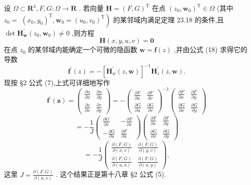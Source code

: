 \begin{example}

\end{example}
设 \(\Omega  \subset  {\mathbf{R}}^{4},F,G : \Omega  \rightarrow  \mathbf{R}\) . 若向量 \(\mathbf{H} = {\left( F,G\right) }^{\mathrm{T}}\) 在点 \({\left( {z}_{0},{\mathbf{w}}_{0}\right) }^{\mathrm{T}} \in  \Omega\) (其中 \({z}_{0} =\)  \(\left. {{\left( {x}_{0},{y}_{0}\right) }^{\mathrm{T}},{\mathbf{w}}_{0} = {\left( {u}_{0},{v}_{0}\right) }^{\mathrm{T}}}\right)\) 的某邻域内满足定理 23.18 的条件,且 \(\det {\mathbf{H}}_{\mathbf{w}}^{\prime }\left( {{z}_{0},{\mathbf{w}}_{0}}\right)  \neq  0\) ,则方程
\[
\mathbf{H}\left( {x,y,u,v}\right)  = \mathbf{0}
\]
在点 \({z}_{0}\) 的某邻域内能确定一个可微的隐函数 \(\mathbf{w} = \mathbf{f}\left( z\right)\) ,并由公式 (18) 求得它的导数
\[
{\mathbf{f}}^{\prime }\left( z\right)  =  - {\left\lbrack  {\mathbf{H}}_{w}^{\prime }\left( z,\mathbf{w}\right) \right\rbrack  }^{-1}{\mathbf{H}}_{z}^{\prime }\left( {z,\mathbf{w}}\right) .
\]
现按 §2 公式 (7),上式可详细地写作
\[
{\mathbf{f}}^{\prime }\left( \mathbf{z}\right)  = \left( \begin{array}{ll} \frac{\partial u}{\partial x} & \frac{\partial u}{\partial y} \\  \frac{\partial v}{\partial x} & \frac{\partial v}{\partial y} \end{array}\right)  =  - {\left( \begin{array}{ll} \frac{\partial F}{\partial u} & \frac{\partial F}{\partial v} \\  \frac{\partial G}{\partial u} & \frac{\partial G}{\partial v} \end{array}\right) }^{-1}\left( \begin{array}{ll} \frac{\partial F}{\partial x} & \frac{\partial F}{\partial y} \\  \frac{\partial G}{\partial x} & \frac{\partial G}{\partial y} \end{array}\right)
\]
\[
=  - \frac{1}{J}\left( \begin{array}{rr} \frac{\partial G}{\partial v} &  - \frac{\partial F}{\partial v} \\   - \frac{\partial G}{\partial u} & \frac{\partial F}{\partial u} \end{array}\right) \left( \begin{array}{ll} \frac{\partial F}{\partial x} & \frac{\partial F}{\partial y} \\  \frac{\partial G}{\partial x} & \frac{\partial G}{\partial y} \end{array}\right)
\]
\[
=  - \frac{1}{J}\left( \begin{array}{ll} \frac{\partial \left( {F,G}\right) }{\partial \left( {x,v}\right) } & \frac{\partial \left( {F,G}\right) }{\partial \left( {y,v}\right) } \\  \frac{\partial \left( {F,G}\right) }{\partial \left( {u,x}\right) } & \frac{\partial \left( {F,G}\right) }{\partial \left( {u,y}\right) } \end{array}\right) ,
\]
这里 \(J = \frac{\partial \left( {F,G}\right) }{\partial \left( {u,v}\right) }\) . 这个结果正是第十八章 §2 公式 (5).

